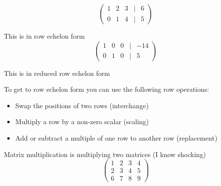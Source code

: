\documentclass{article}
\begin{document}
$$\begin{pmatrix}
1 & 2 & 3 & | & 6 \\
0 & 1 & 4 & | & 5
\end{pmatrix}$$
\par{This is in row echelon form}
$$\begin{pmatrix}
1 & 0 & 0 & | & -14 \\
0 & 1 & 0 & | & 5
\end{pmatrix}$$

\par{This is in reduced row echelon form}\\
\par{To get to row echelon form you can use the following row operations:}
\begin{itemize}
    \item Swap the positions of two rows (interchange)
    \item Multiply a row by a non-zero scalar (scaling)
    \item Add or subtract a multiple of one row to another row (replacement)
\end{itemize}
\par{Matrix multiplication is multiplying two matrices (I know shocking)}
$$
\begin{pmatrix}
    1 & 2 & 3 & 4\\
    2 & 3 & 4 & 5\\
    6 & 7 & 8 & 9
\end{pmatrix}
$$
\end{document}
